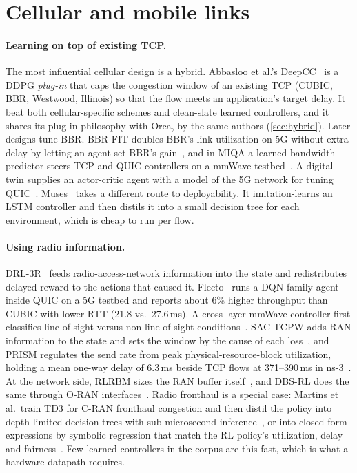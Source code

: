 \section{Cellular and mobile links}
\label{sec:cellular}

\paragraph{Learning on top of existing TCP.} The most influential cellular design is a hybrid. Abbasloo et al.'s DeepCC~\cite{abbasloo2021deepcc} is a DDPG \emph{plug-in} that caps the congestion window of an existing TCP (CUBIC, BBR, Westwood, Illinois) so that the flow meets an application's target delay. It beat both cellular-specific schemes and clean-slate learned controllers, and it shares its plug-in philosophy with Orca, by the same authors (\cref{sec:hybrid}). Later designs tune BBR. BBR-FIT doubles BBR's link utilization on 5G without extra delay by letting an agent set BBR's gain~\cite{xie2022bbr}, and in MIQA a learned bandwidth predictor steers TCP and QUIC controllers on a mmWave testbed~\cite{wu2024miqa}. A digital twin supplies an actor-critic agent with a model of the 5G network for tuning QUIC~\cite{yang2025digital}. Muses~\cite{zhong2022muses} takes a different route to deployability. It imitation-learns an LSTM controller and then distils it into a small decision tree for each environment, which is cheap to run per flow.

\paragraph{Using radio information.} DRL-3R~\cite{chen2021ran} feeds radio-access-network information into the state and redistributes delayed reward to the actions that caused it. Flecto~\cite{serra2025flecto} runs a DQN-family agent inside QUIC on a 5G testbed and reports about 6\% higher throughput than CUBIC with lower RTT (21.8 vs.\ 27.6\,ms). A cross-layer mmWave controller first classifies line-of-sight versus non-line-of-sight conditions~\cite{pan2025intelligent}. SAC-TCPW adds RAN information to the state and sets the window by the cause of each loss~\cite{fan2024cross}, and PRISM regulates the send rate from peak physical-resource-block utilization, holding a mean one-way delay of 6.3\,ms beside TCP flows at 371--390\,ms in ns-3~\cite{hassani2026prism}. At the network side, RLRBM sizes the RAN buffer itself~\cite{ma2022rlrbm}, and DBS-RL does the same through O-RAN interfaces~\cite{jiao2025dynamic}. Radio fronthaul is a special case: Martins et al.\ train TD3 for C-RAN fronthaul congestion and then distil the policy into depth-limited decision trees with sub-microsecond inference~\cite{martins2021policy}, or into closed-form expressions by symbolic regression that match the RL policy's utilization, delay and fairness~\cite{martins2024closed}. Few learned controllers in the corpus are this fast, which is what a hardware datapath requires.

